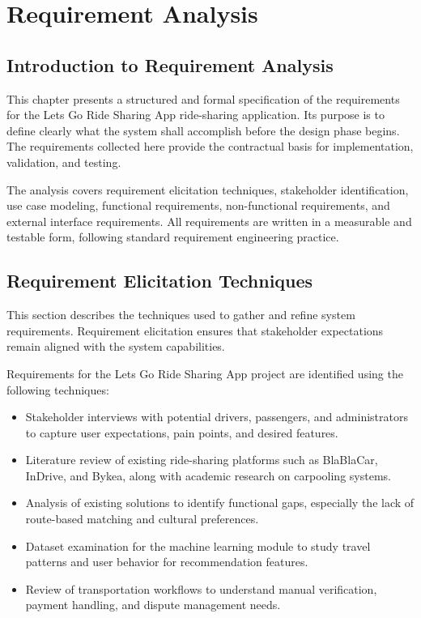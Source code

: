 
\chapter{Requirement Analysis}

\section{Introduction to Requirement Analysis}

This chapter presents a structured and formal specification of the requirements for the Lets Go Ride Sharing App ride-sharing application. Its purpose is to define clearly what the system shall accomplish before the design phase begins. The requirements collected here provide the contractual basis for implementation, validation, and testing.

The analysis covers requirement elicitation techniques, stakeholder identification, use case modeling, functional requirements, non-functional requirements, and external interface requirements. All requirements are written in a measurable and testable form, following standard requirement engineering practice.
\section{Requirement Elicitation Techniques}

This section describes the techniques used to gather and refine system requirements. Requirement elicitation ensures that stakeholder expectations remain aligned with the system capabilities.

Requirements for the Lets Go Ride Sharing App project are identified using the following techniques:

\begin{itemize}
    \item Stakeholder interviews with potential drivers, passengers, and administrators to capture user expectations, pain points, and desired features.
    \item Literature review of existing ride-sharing platforms such as BlaBlaCar, InDrive, and Bykea, along with academic research on carpooling systems.
    \item Analysis of existing solutions to identify functional gaps, especially the lack of route-based matching and cultural preferences.
    \item Dataset examination for the machine learning module to study travel patterns and user behavior for recommendation features.
    \item Review of transportation workflows to understand manual verification, payment handling, and dispute management needs.
\end{itemize}
